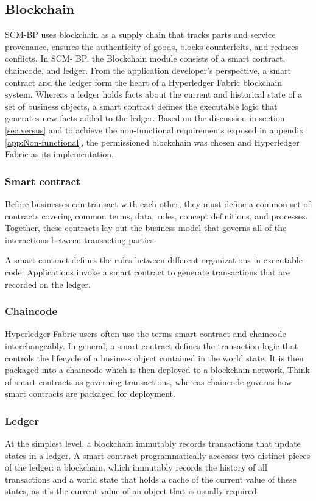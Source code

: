 \subsection{Blockchain}\label{sec:BlockchainModule}

SCM-BP uses blockchain as a supply chain that tracks parts and service provenance, ensures the authenticity of goods, blocks counterfeits, and reduces conflicts. In SCM- BP, the Blockchain module consists of a smart contract, chaincode, and ledger. From the application developer's perspective, a smart contract and the ledger form the heart of a Hyperledger Fabric blockchain system. Whereas a ledger holds facts about the current and historical state of a set of business objects, a smart contract defines the executable logic that generates new facts added to the ledger. 
Based on the discussion in section \ref{sec:versus} and to achieve the non-functional requirements exposed in appendix \ref{app:Non-functional}, the permissioned blockchain was chosen and Hyperledger Fabric as its implementation. 

\subsubsection{Smart contract}
Before businesses can transact with each other, they must define a common set of contracts covering common terms, data, rules, concept definitions, and processes. Together, these contracts lay out the business model that governs all of the interactions between transacting parties.

A smart contract defines the rules between different organizations in executable code. Applications invoke a smart contract to generate transactions that are recorded on the ledger.

\subsubsection{Chaincode}
Hyperledger Fabric users often use the terms smart contract and chaincode interchangeably. In general, a smart contract defines the transaction logic that controls the lifecycle of a business object contained in the world state. It is then packaged into a chaincode which is then deployed to a blockchain network. Think of smart contracts as governing transactions, whereas chaincode governs how smart contracts are packaged for deployment.

\subsubsection{Ledger}
At the simplest level, a blockchain immutably records transactions that update states in a ledger. A smart contract programmatically accesses two distinct pieces of the ledger: a blockchain, which immutably records the history of all transactions and a world state that holds a cache of the current value of these states, as it’s the current value of an object that is usually required.

